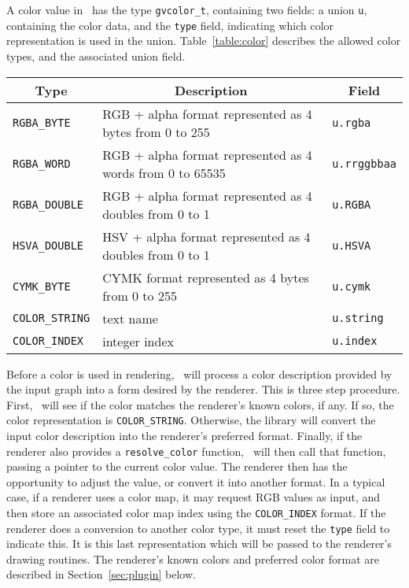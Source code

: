 A color value in \gviz\ has the type {\tt gvcolor\_t}, containing
two fields: a union {\tt u}, containing the color data, and the
{\tt type} field, indicating which color representation is used in
the union. Table~\ref{table:color} describes the allowed color types,
and the associated union field.
\begin{table*}[htb]
\centering
\begin{tabular}[t]{|l|p{3.5in}|l|} \hline
\multicolumn{1}{|c|}{Type} & \multicolumn{1}{c|}{Description} & \multicolumn{1}{c|}{Field}\\ \hline
{\tt RGBA\_BYTE} & RGB + alpha format represented as 4 bytes from 0 to 255 & {\tt u.rgba} \\
{\tt RGBA\_WORD} & RGB + alpha format represented as 4 words from 0 to 65535 & {\tt u.rrggbbaa} \\
{\tt RGBA\_DOUBLE} & RGB + alpha format represented as 4 doubles from 0 to 1 & {\tt u.RGBA} \\
{\tt HSVA\_DOUBLE} & HSV + alpha format represented as 4 doubles from 0 to 1 & {\tt u.HSVA} \\
{\tt CYMK\_BYTE} & CYMK format represented as 4 bytes from 0 to 255 & {\tt u.cymk} \\
{\tt COLOR\_STRING} & text name & {\tt u.string} \\
{\tt COLOR\_INDEX} & integer index & {\tt u.index} \\
\hline
\end{tabular}
\caption{Color type representations}
\label{table:color}
\end{table*}

Before a color is used in rendering, \gviz\ will process a color description
provided by the input graph into a form desired by the renderer.
This is three step procedure. First, \gviz\ will see if the color matches
the renderer's known colors, if any.
If so, the color representation is {\tt COLOR\_STRING}. Otherwise, the
library will convert the input color description into the renderer's
preferred format. Finally, if the
renderer also provides a {\tt resolve\_color} function, \gviz\ will then
call that function, passing a pointer to the current color value. The
renderer then has the opportunity to adjust the value, or convert it
into another format. In a typical case, if a renderer uses a color map,
it may request RGB values as input, and then store an associated
color map index using the {\tt COLOR\_INDEX} format. If the renderer
does a conversion to another color type, it must 
reset the {\tt type} field to indicate this.
It is this last representation which will be passed to the renderer's
drawing routines.
The renderer's known colors and preferred color format are
described in Section~\ref{sec:plugin} below.

